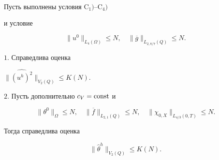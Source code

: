 \begin{props}


Пусть выполнены условия $\mathrm C_1)$--$\mathrm C_4)$


и условие


\begin{equation}


\|u^0\|_{L_4(\Omega)}\le N,\quad


\|\overline g\|_{L_{2,8/7}(Q)}\le N.


\end{equation}





$1.$ Справедлива оценка


$\|\widehat{(u^h)^2}\|_{V_2(Q)}\le K(N)$.





$2.$ Пусть дополнительно $c_V=\operatorname{const}$ и


\begin{equation}


\|\theta^0\|_\Omega\le N,\quad \|\overline f\|_{L_{2,1}(Q)}\le N,\quad


\|\chi_{0,X}\|_{L_{4/3}(0,T)}\le N.


\end{equation}


Тогда справедлива оценка


\begin{equation}


\|\widehat\theta^h\|_{V_2(Q)}\le K(N).


\end{equation}


\end{props}





